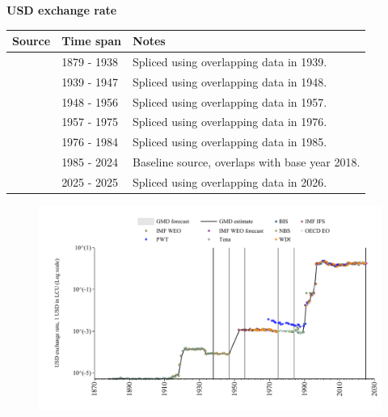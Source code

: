 \documentclass[12pt,a4paper,landscape]{article}
\begin{document}
\begin{adjustbox}{max totalsize={\paperwidth}{\paperheight},center}
\begin{minipage}[t][\textheight][t]{\textwidth}
\vspace*{0.5cm}
{}
\begin{center}
{\Large\bfseries USD exchange rate}
\end{center}
\vspace{0.5cm}
\begin{table}[H]
\centering
\small
\begin{tabular}{|l|l|l|}
\hline
\textbf{Source} & \textbf{Time span} & \textbf{Notes} \\
\hline
\rowcolor{white}\cite{Tena}& 1879 - 1938 &Spliced using overlapping data in 1939. \\
\rowcolor{lightgray}\cite{NBS}& 1939 - 1947 &Spliced using overlapping data in 1948. \\
\rowcolor{white}\cite{IMF_IFS}& 1948 - 1956 &Spliced using overlapping data in 1957. \\
\rowcolor{lightgray}\cite{BIS}& 1957 - 1975 &Spliced using overlapping data in 1976. \\
\rowcolor{white}\cite{OECD_EO}& 1976 - 1984 &Spliced using overlapping data in 1985. \\
\rowcolor{lightgray}\cite{BIS}& 1985 - 2024 &Baseline source, overlaps with base year 2018. \\
\rowcolor{white}\cite{OECD_EO}& 2025 - 2025 &Spliced using overlapping data in 2026. \\
\hline
\end{tabular}
\end{table}
\begin{figure}[H]
\centering
\includegraphics[width=\textwidth,height=0.6\textheight,keepaspectratio]{graphs/BGR_USDfx.pdf}
\end{figure}
\end{minipage}
\end{adjustbox}
\end{document}
